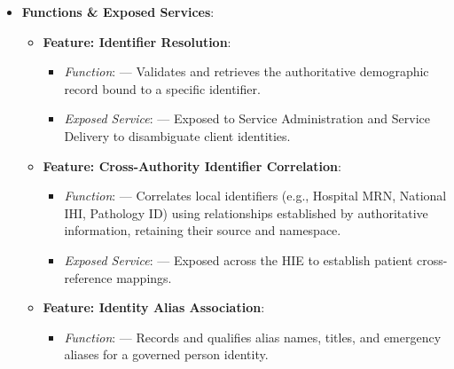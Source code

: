 \begin{itemize}
\begin{itemize}
\end{itemize}


\item 
\textbf{Functions \& Exposed Services}:


\begin{itemize}

\item 
\textbf{Feature: Identifier Resolution}:


\begin{itemize}

\item 
\emph{Function}: \texttt{} — Validates and retrieves the authoritative demographic record bound to a specific identifier.



\item 
\emph{Exposed Service}: \texttt{} — Exposed to Service Administration and Service Delivery to disambiguate client identities.



\end{itemize}


\item 
\textbf{Feature: Cross-Authority Identifier Correlation}:


\begin{itemize}

\item 
\emph{Function}: \texttt{} — Correlates local identifiers (e.g., Hospital MRN, National IHI, Pathology ID) using relationships established by authoritative information, retaining their source and namespace.



\item 
\emph{Exposed Service}: \texttt{} — Exposed across the HIE to establish patient cross-reference mappings.



\end{itemize}


\item 
\textbf{Feature: Identity Alias Association}:


\begin{itemize}

\item 
\emph{Function}: \texttt{} — Records and qualifies alias names, titles, and emergency aliases for a governed person identity.




\end{itemize}
\end{itemize}
\end{itemize}
